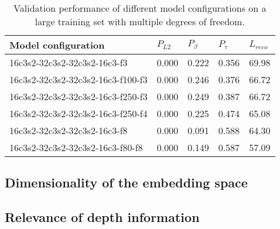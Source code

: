 \begin{table}
\begin{center}
    \begin{tabular}{| l | l | l | l | l |}
      \hline
     Model configuration  &  $P_{L2}$ & $P_{\beta}$ & $P_{\tau}$ & $L_{reco}$ \\ \hline
     16c3s2-32c3s2-32c3s2-16c3-f3     & 0.000 & 0.222 & 0.356 & 69.98 \\
     16c3s2-32c3s2-32c3s2-16c3-f100-f3 & 0.000 & 0.246 & 0.376 & 66.72 \\
     16c3s2-32c3s2-32c3s2-16c3-f250-f3 & 0.000 & 0.249 & 0.387 & 66.72 \\
     16c3s2-32c3s2-32c3s2-16c3-f250-f4 & 0.000 & 0.225 & 0.474 & 65.08 \\
     16c3s2-32c3s2-32c3s2-16c3-f8      & 0.000 & 0.091 & 0.588 & 64.30 \\
     16c3s2-32c3s2-32c3s2-16c3-f80-f8  & 0.000 & 0.149 & 0.587 & 57.09 \\ \hline
    \end{tabular}
\end{center}
  \caption{Validation performance of different model configurations on a large training set with multiple degrees of freedom.}
  \label{tab:large}
\end{table}




\subsection{Dimensionality of the embedding space}


\subsection{Relevance of depth information}
